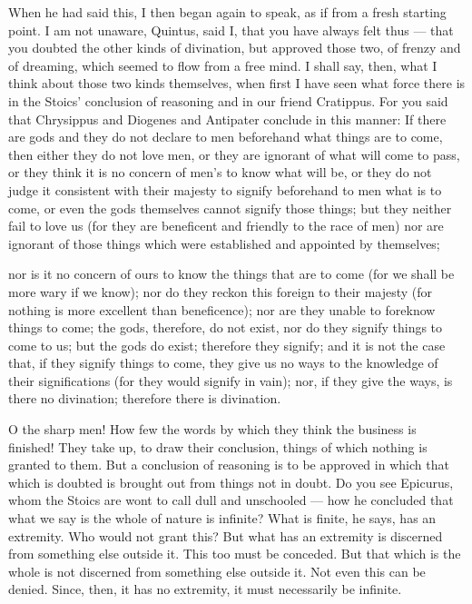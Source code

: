  When he had said this, I then began again to speak, as if from a fresh starting point. I am not unaware, Quintus, said I, that you have always felt thus — that you doubted the other kinds of divination, but approved those two, of frenzy and of dreaming, which seemed to flow from a free mind. I shall say, then, what I think about those two kinds themselves, when first I have seen what force there is in the Stoics' conclusion of reasoning and in our friend Cratippus. For you said that Chrysippus and Diogenes and Antipater conclude in this manner: If there are gods and they do not declare to men beforehand what things are to come, then either they do not love men, or they are ignorant of what will come to pass, or they think it is no concern of men's to know what will be, or they do not judge it consistent with their majesty to signify beforehand to men what is to come, or even the gods themselves cannot signify those things; but they neither fail to love us (for they are beneficent and friendly to the race of men) nor are ignorant of those things which were established and appointed by themselves;

 nor is it no concern of ours to know the things that are to come (for we shall be more wary if we know); nor do they reckon this foreign to their majesty (for nothing is more excellent than beneficence); nor are they unable to foreknow things to come; the gods, therefore, do not exist, nor do they signify things to come to us; but the gods do exist; therefore they signify; and it is not the case that, if they signify things to come, they give us no ways to the knowledge of their significations (for they would signify in vain); nor, if they give the ways, is there no divination; therefore there is divination.

 O the sharp men! How few the words by which they think the business is finished! They take up, to draw their conclusion, things of which nothing is granted to them. But a conclusion of reasoning is to be approved in which that which is doubted is brought out from things not in doubt. Do you see Epicurus, whom the Stoics are wont to call dull and unschooled — how he concluded that what we say is the whole of nature is infinite? What is finite, he says, has an extremity. Who would not grant this? But what has an extremity is discerned from something else outside it. This too must be conceded. But that which is the whole is not discerned from something else outside it. Not even this can be denied. Since, then, it has no extremity, it must necessarily be infinite.

